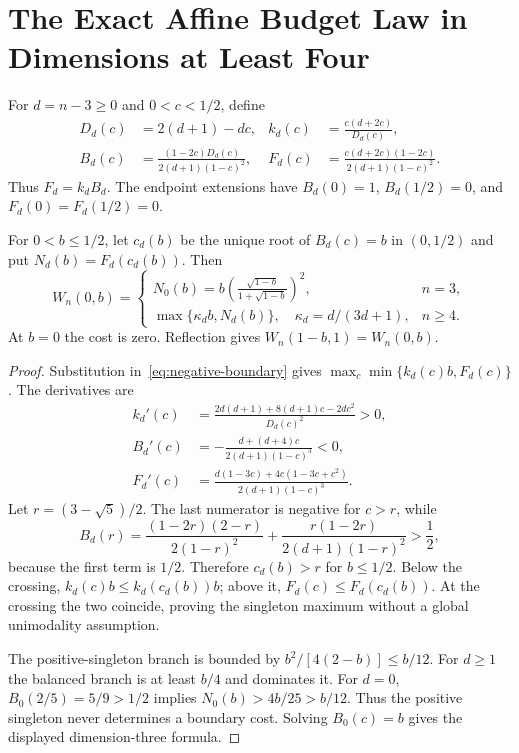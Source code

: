 \section{The Exact Affine Budget Law in Dimensions at Least Four}\label{sec:budgets}
For $d=n-3\ge0$ and $0<c<1/2$, define
\begin{align}
D_d(c)&=2(d+1)-dc,&
k_d(c)&=\frac{c(d+2c)}{D_d(c)},\nonumber\\
B_d(c)&=\frac{(1-2c)D_d(c)}{2(d+1)(1-c)^2},&
F_d(c)&=\frac{c(d+2c)(1-2c)}{2(d+1)(1-c)^2}.\label{eq:boundary-functions}
\end{align}
Thus $F_d=k_dB_d$. The endpoint extensions have $B_d(0)=1$, $B_d(1/2)=0$, and $F_d(0)=F_d(1/2)=0$.

\begin{theorem}\label{thm:boundary}
For $0<b\le1/2$, let $c_d(b)$ be the unique root of $B_d(c)=b$ in $(0,1/2)$ and put $N_d(b)=F_d(c_d(b))$. Then
\begin{equation}\label{eq:boundary-cost}
W_n(0,b)=
\begin{cases}
N_0(b)=\displaystyle b\left(\frac{\sqrt{1-b}}{1+\sqrt{1-b}}\right)^2,&n=3,\\[3pt]
\max\{\kappa_d b,N_d(b)\},\quad \kappa_d=d/(3d+1),&n\ge4.
\end{cases}
\end{equation}
At $b=0$ the cost is zero. Reflection gives $W_n(1-b,1)=W_n(0,b)$.
\end{theorem}
\begin{proof}
Substitution in~\eqref{eq:negative-boundary} gives $\max_c\min\{k_d(c)b,F_d(c)\}$. The derivatives are
\begin{align*}
k_d'(c)&=\frac{2d(d+1)+8(d+1)c-2dc^2}{D_d(c)^2}>0,\\
B_d'(c)&=-\frac{d+(d+4)c}{2(d+1)(1-c)^3}<0,\\
F_d'(c)&=\frac{d(1-3c)+4c(1-3c+c^2)}{2(d+1)(1-c)^3}.
\end{align*}
Let $r=(3-\sqrt5)/2$. The last numerator is negative for $c>r$, while
\[
B_d(r)=\frac{(1-2r)(2-r)}{2(1-r)^2}
       +\frac{r(1-2r)}{2(d+1)(1-r)^2}>\frac12,
\]
because the first term is $1/2$. Therefore $c_d(b)>r$ for $b\le1/2$. Below the crossing, $k_d(c)b\le k_d(c_d(b))b$; above it, $F_d(c)\le F_d(c_d(b))$. At the crossing the two coincide, proving the singleton maximum without a global unimodality assumption.

The positive-singleton branch is bounded by $b^2/[4(2-b)]\le b/12$. For $d\ge1$ the balanced branch is at least $b/4$ and dominates it. For $d=0$, $B_0(2/5)=5/9>1/2$ implies $N_0(b)>4b/25>b/12$. Thus the positive singleton never determines a boundary cost. Solving $B_0(c)=b$ gives the displayed dimension-three formula.
\end{proof}

